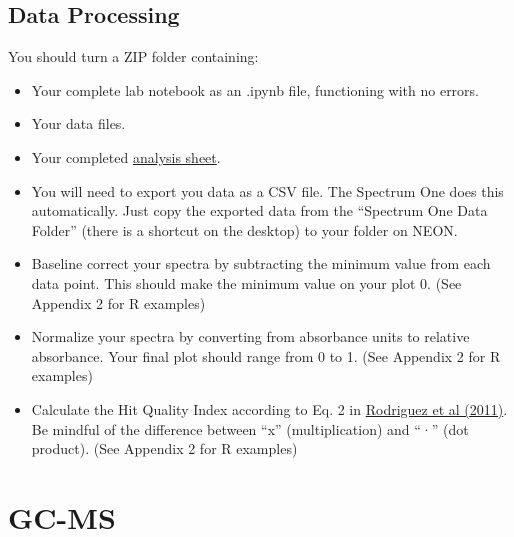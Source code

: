 \documentclass[]{tufte-book}
\providecommand{\tightlist}{%
  \setlength{\itemsep}{0pt}\setlength{\parskip}{0pt}}
\begin{document}
\hypertarget{data-processing-1}{%
\subsection{Data Processing}\label{data-processing-1}}

\begin{marginfigure}
You should turn a ZIP folder containing:

\begin{itemize}
\tightlist
\item
  Your complete lab notebook as an .ipynb file, functioning with no
  errors.\\
\item
  Your data files.\\
\item
  Your completed
  \href{https://github.com/alphonse/alphonse.github.io/raw/master/chem370/assignments/excel-templates/rotation_ftir_data-analysis.xlsx}{analysis
  sheet}.
\end{itemize}
\end{marginfigure}

\begin{itemize}
\tightlist
\item
  You will need to export you data as a CSV file. The Spectrum One does this automatically. Just copy the exported data from the ``Spectrum One Data Folder'' (there is a shortcut on the desktop) to your folder on NEON.
\item
  Baseline correct your spectra by subtracting the minimum value from each data point. This should make the minimum value on your plot 0. (See Appendix 2 for R examples)
\item
  Normalize your spectra by converting from absorbance units to relative absorbance. Your final plot should range from 0 to 1. (See Appendix 2 for R examples)
\item
  Calculate the Hit Quality Index according to Eq. 2 in \href{https://www.researchgate.net/publication/51602215_Standardization_of_Raman_spectra_for_transfer_of_spectral_libraries_across_different_instruments}{Rodriguez et al (2011)}. Be mindful of the difference between ``x'' (multiplication) and ``·'' (dot product). (See Appendix 2 for R examples)
\end{itemize}

\newpage

\hypertarget{am-gcms}{%
\section{GC-MS}\label{am-gcms}}
\end{document}
